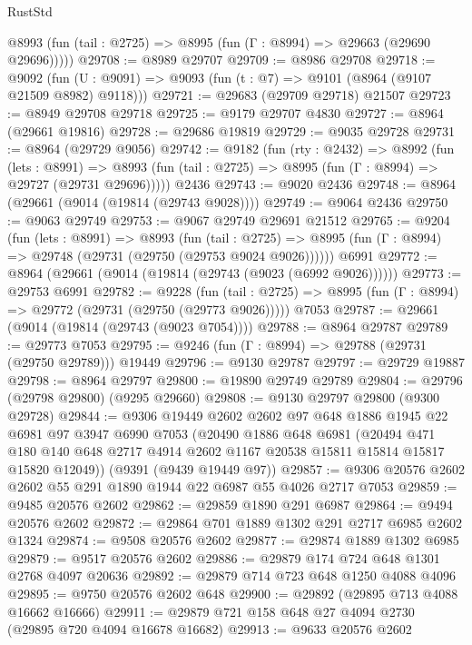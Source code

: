 \begin{lexlean}{RustStd}
\begin{coremodule}
      @8993 (fun (tail : @2725) => @8995 (fun (Γ : @8994) => @29663 (@29690 @29696)))))
@29708 := @8989 @29707
@29709 := @8986 @29708
@29718 := @9092
    (fun (U : @9091) => @9093 (fun (t : @7) => @9101 (@8964 (@9107 @21509 @8982) @9118)))
@29721 := @29683 (@29709 @29718) @21507
@29723 := @8949 @29708 @29718
@29725 := @9179 @29707 @4830
@29727 := @8964 (@29661 @19816)
@29728 := @29686 @19819
@29729 := @9035 @29728
@29731 := @8964 (@29729 @9056)
@29742 := @9182
    (fun (rty : @2432) =>
    @8992
      (fun (lets : @8991) =>
      @8993 (fun (tail : @2725) => @8995 (fun (Γ : @8994) => @29727 (@29731 @29696)))))
    @2436
@29743 := @9020 @2436
@29748 := @8964 (@29661 (@9014 (@19814 (@29743 @9028))))
@29749 := @9064 @2436
@29750 := @9063 @29749
@29753 := @9067 @29749 @29691 @21512
@29765 := @9204
    (fun (lets : @8991) =>
    @8993
      (fun (tail : @2725) =>
      @8995 (fun (Γ : @8994) => @29748 (@29731 (@29750 (@29753 @9024 @9026))))))
    @6991
@29772 := @8964 (@29661 (@9014 (@19814 (@29743 (@9023 (@6992 @9026))))))
@29773 := @29753 @6991
@29782 := @9228
    (fun (tail : @2725) => @8995 (fun (Γ : @8994) => @29772 (@29731 (@29750 (@29773 @9026)))))
    @7053
@29787 := @29661 (@9014 (@19814 (@29743 (@9023 @7054))))
@29788 := @8964 @29787
@29789 := @29773 @7053
@29795 := @9246 (fun (Γ : @8994) => @29788 (@29731 (@29750 @29789))) @19449
@29796 := @9130 @29787
@29797 := @29729 @19887
@29798 := @8964 @29797
@29800 := @19890 @29749 @29789
@29804 := @29796 (@29798 @29800) (@9295 @29660)
@29808 := @9130 @29797 @29800 (@9300 @29728)
@29844 := @9306
    @19449
    @2602
    @2602
    @97
    @648
    @1886
    @1945
    @22
    @6981
    @97
    @3947
    @6990
    @7053
    (@20490
      @1886
      @648
      @6981
      (@20494
        @471
        @180
        @140
        @648
        @2717
        @4914
        @2602
        @1167
        @20538
        @15811
        @15814
        @15817
        @15820
        @12049))
    (@9391 (@9439 @19449 @97))
@29857 := @9306 @20576 @2602 @2602 @55 @291 @1890 @1944 @22 @6987 @55 @4026 @2717 @7053
@29859 := @9485 @20576 @2602
@29862 := @29859 @1890 @291 @6987
@29864 := @9494 @20576 @2602
@29872 := @29864 @701 @1889 @1302 @291 @2717 @6985 @2602 @1324
@29874 := @9508 @20576 @2602
@29877 := @29874 @1889 @1302 @6985
@29879 := @9517 @20576 @2602
@29886 := @29879 @174 @724 @648 @1301 @2768 @4097 @20636
@29892 := @29879 @714 @723 @648 @1250 @4088 @4096
@29895 := @9750 @20576 @2602 @648
@29900 := @29892 (@29895 @713 @4088 @16662 @16666)
@29911 := @29879 @721 @158 @648 @27 @4094 @2730 (@29895 @720 @4094 @16678 @16682)
@29913 := @9633 @20576 @2602

\end{coremodule}
\end{lexlean}
